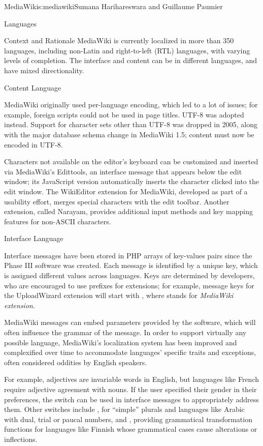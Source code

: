 \begin{aosachapter}{MediaWiki}{s:mediawiki}{Sumana Harihareswara and Guillaume Paumier}
\begin{aosasect1}{Languages}
\begin{aosasect2}{Context and Rationale}
MediaWiki is currently localized in more than 350 languages, including
non-Latin and right-to-left (RTL) languages, with varying levels of
completion. The interface and content can be in different languages,
and have mixed directionality.

\end{aosasect2}

\begin{aosasect2}{Content Language}

MediaWiki originally used per-language encoding, which led to a lot of
issues; for example, foreign scripts could not be used in page
titles. UTF-8 was adopted instead. Support for character sets other
than UTF-8 was dropped in 2005, along with the major database schema
change in MediaWiki 1.5; content must now be encoded in UTF-8.

Characters not available on the editor's keyboard can be customized and
inserted via MediaWiki's Edittools, an interface message that appears
below the edit window; its JavaScript version automatically inserts
the character clicked into the edit window. The WikiEditor extension
for MediaWiki, developed as part of a usability effort, merges special
characters with the edit toolbar. Another extension, called Narayam,
provides additional input methods and key mapping features for
non-ASCII characters.

\end{aosasect2}

\begin{aosasect2}{Interface Language}

Interface messages have been stored in PHP arrays of key-values pairs
since the Phase III software was created. Each message is identified
by a unique key, which is assigned different values across
languages. Keys are determined by developers, who are encouraged to
use prefixes for extensions; for example, message keys for the
UploadWizard extension will start with , where
 stands for \emph{MediaWiki extension}.

MediaWiki messages can embed parameters provided by the software,
which will often influence the grammar of the message. In order to
support virtually any possible language, MediaWiki's localization
system has been improved and complexified over time to accommodate
languages' specific traits and exceptions, often considered oddities by
English speakers.

For example, adjectives are invariable words in English, but languages
like French require adjective agreement with nouns. If the user
specified their gender in their preferences, the 
switch can be used in interface messages to appropriately address
them. Other switches include , for ``simple'' plurals
and languages like Arabic with dual, trial or paucal numbers, and
, providing grammatical transformation functions
for languages like Finnish whose grammatical cases cause alterations
or inflections.


\end{aosasect2}
\end{aosasect1}
\end{aosachapter}
